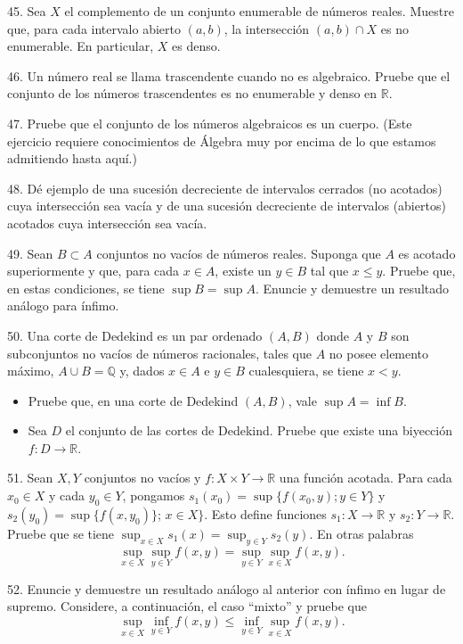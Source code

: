 \documentclass[12pt,oneside]{book}
\begin{document}
45. Sea \(X\) el complemento de un conjunto enumerable de números reales. Muestre que, para cada intervalo abierto \((a, b)\), la intersección \((a, b) \cap X\) es no enumerable. En particular, \(X\) es denso.

46. Un número real se llama trascendente cuando no es algebraico. Pruebe que el conjunto de los números trascendentes es no enumerable y denso en \(\mathbb{R}\).

47. Pruebe que el conjunto de los números algebraicos es un cuerpo. (Este ejercicio requiere conocimientos de Álgebra muy por encima de lo que estamos admitiendo hasta aquí.)

48. Dé ejemplo de una sucesión decreciente de intervalos cerrados (no acotados) cuya intersección sea vacía y de una sucesión decreciente de intervalos (abiertos) acotados cuya intersección sea vacía.

49. Sean \(B \subset A\) conjuntos no vacíos de números reales. Suponga que \(A\) es acotado superiormente y que, para cada \(x \in A\), existe un \(y \in B\) tal que \(x \leq y\). Pruebe que, en estas condiciones, se tiene \(\sup B = \sup A\). Enuncie y demuestre un resultado análogo para ínfimo.

50. Una corte de Dedekind es un par ordenado \((A, B)\) donde \(A\) y \(B\) son subconjuntos no vacíos de números racionales, tales que \(A\) no posee elemento máximo, \(A \cup B = \mathbb{Q}\) y, dados \(x \in A\) e \(y \in B\) cualesquiera, se tiene \(x < y\).

\begin{itemize}
    \item [a)] Pruebe que, en una corte de Dedekind \((A, B)\), vale \(\sup A = \inf B\).
    \item [b)] Sea \(D\) el conjunto de las cortes de Dedekind. Pruebe que existe una biyección \(f: D \to \mathbb{R}\).
\end{itemize}

51. Sean \(X, Y\) conjuntos no vacíos y \(f: X \times Y \to \mathbb{R}\) una función acotada. Para cada \(x_0 \in X\) y cada \(y_0 \in Y\), pongamos \(s_1(x_0) = \sup\{f(x_0, y); y \in Y\}\) y \(s_2(y_0) = \sup\{f(x, y_0)\}\); \(x \in X\}\). Esto define funciones \(s_1: X \to \mathbb{R}\) y \(s_2: Y \to \mathbb{R}\). Pruebe que se tiene \(\sup_{x\in X} s_1(x) = \sup_{y\in Y} s_2(y)\). En otras palabras
\[
\sup_{x \in X} \sup_{y \in Y} f(x, y) = \sup_{y \in Y} \sup_{x \in X} f(x, y).
\]

52. Enuncie y demuestre un resultado análogo al anterior con ínfimo en lugar de supremo. Considere, a continuación, el caso “mixto” y pruebe que
\[
\sup_{x \in X} \inf_{y \in Y} f(x, y) \leq \inf_{y \in Y} \sup_{x \in X} f(x, y).
\]
\end{document}
